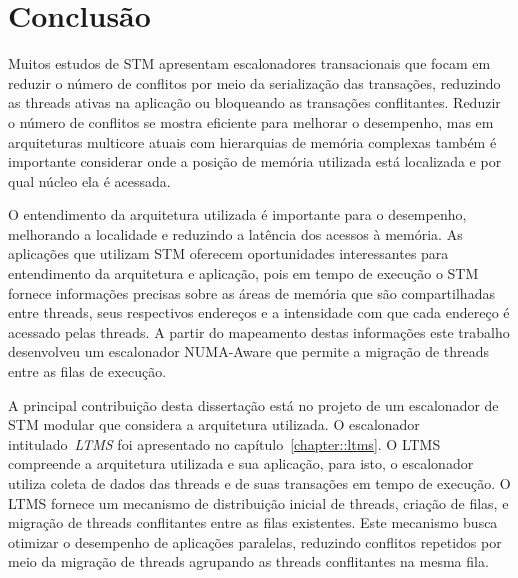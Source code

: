 \documentclass[diss,capa]{texufpel}
\begin{document}
\chapter{Conclusão}
\label{chapter::conclusao}

Muitos estudos de STM apresentam escalonadores transacionais que focam em reduzir o número de conflitos por meio da serialização das transações, reduzindo as threads ativas na aplicação ou bloqueando as transações conflitantes. Reduzir o número de conflitos se mostra eficiente para melhorar o desempenho, mas em arquiteturas multicore atuais com hierarquias de memória complexas também é importante considerar onde a posição de memória utilizada está localizada e por qual núcleo ela é acessada.

O entendimento da arquitetura utilizada é importante para o desempenho, melhorando a localidade e reduzindo a latência dos acessos à memória. As aplicações que utilizam STM oferecem oportunidades interessantes para entendimento da arquitetura e aplicação, pois em tempo de execução o STM fornece informações precisas sobre as áreas de memória que são compartilhadas entre threads, seus respectivos endereços e a intensidade com que cada endereço é acessado pelas threads. A partir do mapeamento destas informações este trabalho desenvolveu um escalonador NUMA-Aware que permite a migração de threads entre as filas de execução.

A principal contribuição desta dissertação está no projeto de um escalonador de STM modular que considera a arquitetura utilizada. O escalonador intitulado~\emph{LTMS} foi apresentado no capítulo~\ref{chapter::ltms}. O LTMS compreende a arquitetura utilizada e sua aplicação, para isto, o escalonador utiliza coleta de dados das threads e de suas transações em tempo de execução. O LTMS fornece um mecanismo de distribuição inicial de threads, criação de filas, e migração de threads conflitantes entre as filas existentes. Este mecanismo busca otimizar o desempenho de aplicações paralelas, reduzindo conflitos repetidos por meio da migração de threads agrupando as threads conflitantes na mesma fila.
\end{document}
